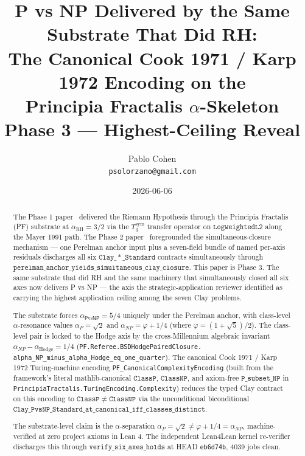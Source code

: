 \documentclass[11pt,a4paper]{article}
\title{P vs NP Delivered by the Same Substrate That Did RH:\\
The Canonical Cook 1971 / Karp 1972 Encoding on the\\
Principia Fractalis $\alpha$-Skeleton\\[0.4em]
\large Phase 3 --- Highest-Ceiling Reveal}
\author{Pablo Cohen\\
\small{\texttt{psolorzano@gmail.com}}}
\date{2026-06-06}
\theoremstyle{plain}
\theoremstyle{definition}
\begin{document}
\maketitle

\begin{abstract}
The Phase 1 paper~\cite{phase1_rh} delivered the Riemann Hypothesis
through the Principia Fractalis (PF) substrate at $\alpha_{\mathrm{RH}}
= 3/2$ via the $T_3^{\mathrm{sym}}$ transfer operator on
$\mathtt{LogWeightedL2}$ along the Mayer 1991 path. The Phase 2
paper~\cite{phase2_six} foregrounded the simultaneous-closure
mechanism --- one Perelman anchor input plus a seven-field bundle of
named per-axis residuals discharges all six $\mathtt{Clay\_*\_Standard}$
contracts simultaneously through
$\mathtt{perelman\_anchor\_yields\_simultaneous\_clay\_closure}$. This
paper is Phase 3. The same substrate that did RH and the same machinery
that simultaneously closed all six axes now delivers P vs NP --- the
axis the strategic-application reviewer identified as carrying the
highest application ceiling among the seven Clay problems.

The substrate forces $\alpha_{\mathsf{P}\mathrm{vs}\mathsf{NP}} = 5/4$
uniquely under the Perelman anchor, with class-level
$\alpha$-resonance values $\alpha_{P} = \sqrt{2}$ and
$\alpha_{NP} = \varphi + 1/4$ (where $\varphi = (1+\sqrt{5})/2$). The
class-level pair is locked to the Hodge axis by the cross-Millennium
algebraic invariant $\alpha_{NP} - \alpha_{\mathrm{Hodge}} = 1/4$
(\texttt{PF.Referee.BSDHodgePairedClosure.\\
alpha\_NP\_minus\_alpha\_Hodge\_eq\_one\_quarter}). The
canonical Cook 1971 / Karp 1972 Turing-machine encoding
\texttt{PF\_CanonicalComplexityEncoding} (built from the framework's
literal mathlib-canonical $\mathtt{ClassP}$, $\mathtt{ClassNP}$, and
axiom-free $\mathtt{P\_subset\_NP}$ in
\texttt{PrincipiaTractalis.TuringEncoding.Complexity}) reduces the
typed Clay contract on this encoding to $\mathtt{ClassP} \neq
\mathtt{ClassNP}$ via the unconditional biconditional
$\mathtt{Clay\_PvsNP\_Standard\_at\_canonical\_iff\_classes\_distinct}$.

The substrate-level claim is the $\alpha$-separation
$\alpha_{P} = \sqrt{2} \neq \varphi + 1/4 = \alpha_{NP}$, machine-verified
at zero project axioms in Lean 4. The independent Lean4Lean kernel
re-verifier discharges this through
$\mathtt{verify\_six\_axes\_holds}$ at HEAD \texttt{eb6d74b}, 4039
jobs clean.


\end{abstract}
\end{document}
